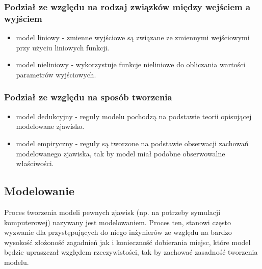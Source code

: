 \subsubsection{Podział ze względu na rodzaj związków między wejściem a wyjściem}
\par{
\begin{itemize}
\item model liniowy - zmienne wyjściowe są związane ze zmiennymi wejściowymi przy użyciu liniowych funkcji.
\item model nieliniowy - wykorzystuje funkcje nieliniowe do obliczania wartości parametrów wyjściowych.
\end{itemize}
}

\subsubsection{Podział ze względu na sposób tworzenia}
\par{
\begin{itemize}
\item model dedukcyjny - reguły modelu pochodzą na podstawie teorii opisującej modelowane zjawisko.
\item model empiryczny - reguły są tworzone na podstawie obserwacji zachowań modelowanego zjawiska, tak by model miał podobne obserwowalne właściwości.
\end{itemize}
}

\subsection{Modelowanie}
\par{
Proces tworzenia modeli pewnych zjawisk (np. na potrzeby symulacji komputerowej) nazywany jest modelowaniem. Proces ten, stanowi często wyzwanie dla przystępujących do niego inżynierów ze względu na bardzo wysokość złożoność zagadnień jak i konieczność dobierania miejsc, które model będzie upraszczał względem rzeczywistości, tak by zachować zasadność tworzenia modelu.
}

